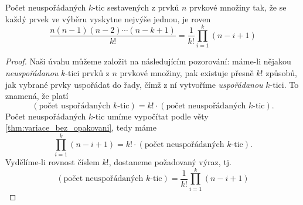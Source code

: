 \begin{theorem}\label{thm:kombinace_bez_opakovani}
    Počet neuspořádaných $k$-tic sestavených z prvků $n$ prvkové množiny tak, že se každý prvek ve výběru vyskytne nejvýše jednou, je roven
    \begin{equation*}
        \dfrac{n(n-1)(n-2)\cdots(n-k+1)}{k!}=\dfrac{1}{k!}\prod_{i=1}^{k}(n-i+1)
    \end{equation*}
\end{theorem}
\begin{proof}
    Naši úvahu můžeme založit na následujícím pozorování: máme-li nějakou \emph{neuspořádanou} $k$-tici prvků z $n$ prvkové množiny, pak existuje přesně $k!$ způsobů, jak vybrané prvky uspořádat do řady, čímž z ní vytvoříme \emph{uspořádanou} $k$-tici. To znamená, že platí
    \begin{equation*}
        (\text{počet uspořádaných $k$-tic})=k!\cdot(\text{počet neuspořádaných $k$-tic}).
    \end{equation*}
    Počet neuspořádaných $k$-tic umíme vypočítat podle věty \ref{thm:variace_bez_opakovani}, tedy máme
    \begin{equation*}
        \prod_{i=1}^{k}(n-i+1)=k!\cdot(\text{počet neuspořádaných $k$-tic}).
    \end{equation*}
    Vydělíme-li rovnost číslem $k!$, dostaneme požadovaný výraz, tj.
    \begin{equation*}
        (\text{počet neuspořádaných $k$-tic})=\dfrac{1}{k!}\prod_{i=1}^{k}(n-i+1)
    \end{equation*}
\end{proof}